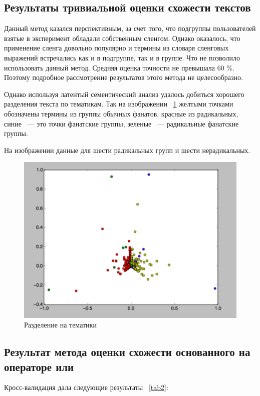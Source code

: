 \documentclass[annotation,times,page4]{itmo-student-thesis}
\begin{document}
\subsection{Результаты тривиальной оценки схожести текстов}
Данный метод казался перспективным, за счет того, что подгруппы пользователей взятые в эксперимент обладали собственным сленгом. Однако оказалось, что 
применение сленга довольно популярно и термины из словаря сленговых выражений встречались как и в подгруппе, так и в группе. Что не позволило использовать данный метод. Средняя оценка точности не превышала 60 \%. Поэтому подробное рассмотрение результатов этого метода не целесообразно.

Однако используя латентый сементический анализ удалось добиться хорошего разделения текста по тематикам. Так на изображении ~\ref{fig:sem} желтыми точками обозначены термины из группы обычных фанатов, красные из радикальных, синие ~--- это точки фанатские группы, зеленые ~--- радикальные фанатские группы. 

На изображении данные для шести радикальных групп и шести нерадикальных. 
\begin{figure}[!h]
\caption{Разделение на тематики}
\label{fig:sem}
\centering
\includegraphics[width=\textwidth]{figs/sem.pdf}
\end{figure}

\newpage
\subsection{Результат метода оценки схожести основанного на операторе или}

Кросс-валидация дала следующие результаты {~\ref{tab2}}:
\end{document}

